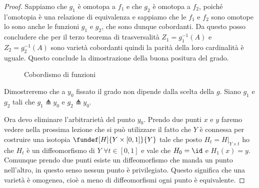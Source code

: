 \begin{proof}
 Sappiamo che $g_{1}$ è omotopa a $f_{1}$ e che $g_{2}$ è omotopa a $f_{2}$, poiché l'omotopia è una relazione di equivalenza e sappiamo che le $f_{1}$ e $f_{2}$ sono omotope lo sono 
 anche le funzioni $g_{1}$ e $g_{2}$, che sono dunque cobordanti. Da questo posso concludere che per il terzo teorema di trasversalità $Z_{1} = g_{1}^{-1} (A)$ e $Z_{2} = g_{2}^{-1} (A)$ sono
 varietà cobordanti quindi la parità della loro cardinalità è uguale. Questo conclude la dimostrazione della buona positura del grado.
 
\begin{figure}
    \centering %
    
    \caption{Cobordismo di funzioni}
\end{figure}
 

 Dimostreremo che a $y_{0}$ fissato il grado non dipende dalla scelta della $g$. Siano $g_{1}$ e $g_{2}$ tali che $g_1 \pitchfork {y_0}$ e $g_{2} \pitchfork {y_{0}}$.
 
Ora devo eliminare l'arbitrarietà del punto $y_{0}$. Prendo due punti $x$ e $y$ faremo vedere nella prossima lezione che si può utilizzare il fatto che $Y$ è connessa per costruire una isotopia
$\fundef[H]{Y \times [0,1]}{Y}$ tale che posto $H_{t} = H|_{Y \times {t}}$ ho che $H_{t}$ è un diffeomorfismo di $Y$ $\forall t \in [0,1]$  e vale che $H_{0} = \id$ e $H_{1} (x) = y$.
Comunque prendo due punti esiste un diffeomorfismo che manda un punto nell'altro, in questo senso nessun punto è privilegiato. Questo significa che una varietà è omogenea, cioè a meno di 
diffeomorfismi ogni punto è equivalente.
\end{proof}



